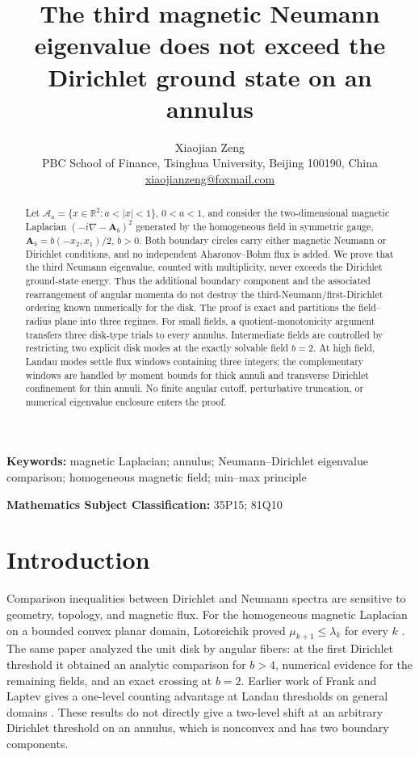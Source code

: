 \documentclass[11pt]{article}
\title{The third magnetic Neumann eigenvalue does not exceed the Dirichlet ground state on an annulus}
\author{Xiaojian Zeng\\
\small PBC School of Finance, Tsinghua University, Beijing 100190, China\\
\small \href{mailto:xiaojianzeng@foxmail.com}{xiaojianzeng@foxmail.com}}
\date{}
\newcommand{\Aa}{\mathcal A_a}
\newcommand{\R}{\mathbb R}
\newcommand{\Afield}{\mathbf A_b}
\begin{document}
\maketitle

\begin{abstract}
Let $\Aa=\{x\in\R^2:a<|x|<1\}$, $0<a<1$, and consider the
two-dimensional magnetic Laplacian $(-i\nabla-\Afield)^2$ generated by the
homogeneous field in symmetric gauge, $\Afield=b(-x_2,x_1)/2$, $b>0$.
Both boundary circles carry either magnetic Neumann or Dirichlet conditions,
and no independent Aharonov--Bohm flux is added.  We prove that the third
Neumann eigenvalue, counted with multiplicity, never exceeds the Dirichlet
ground-state energy.  Thus the additional boundary component and the
associated rearrangement of angular momenta do not destroy the
third-Neumann/first-Dirichlet ordering known numerically for the disk.
The proof is exact and partitions the field--radius plane into three regimes.
For small fields, a quotient-monotonicity argument transfers three disk-type
trials to every annulus.  Intermediate fields are controlled by restricting
two explicit disk modes at the exactly solvable field $b=2$.  At high field,
Landau modes settle flux windows containing three integers; the complementary
windows are handled by moment bounds for thick annuli and transverse
Dirichlet confinement for thin annuli.  No finite angular cutoff,
perturbative truncation, or numerical eigenvalue enclosure enters the proof.
\end{abstract}

\noindent\textbf{Keywords:} magnetic Laplacian; annulus; Neumann--Dirichlet
eigenvalue comparison; homogeneous magnetic field; min--max principle

\noindent\textbf{Mathematics Subject Classification:} 35P15; 81Q10

\section{Introduction}

Comparison inequalities between Dirichlet and Neumann spectra are sensitive
to geometry, topology, and magnetic flux.  For the homogeneous magnetic
Laplacian on a bounded convex planar domain, Lotoreichik proved
$\mu_{k+1}\leq\lambda_k$ for every $k$ \cite{Lotoreichik2025}.  The same
paper analyzed the unit disk by angular fibers: at the first Dirichlet
threshold it obtained an analytic comparison for $b>4$, numerical evidence
for the remaining fields, and an exact crossing at $b=2$.  Earlier work of
Frank and Laptev gives a one-level counting advantage at Landau thresholds
on general domains \cite{FrankLaptev2010}.  These results do not directly
give a two-level shift at an arbitrary Dirichlet threshold on an annulus,
which is nonconvex and has two boundary components.
\end{document}
